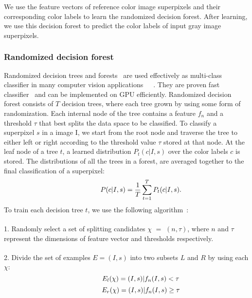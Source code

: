 \documentclass[twocolumn]{svjour3}          %
\begin{document}
We use the feature vectors of reference color image superpixels and their corresponding color labels to learn the randomized decision forest. After learning, we use this decision forest to predict the color labels of input gray image superpixels. 

\subsubsection{Randomized decision forest}
Randomized decision trees and forests~\cite{Leo01} are used effectively as multi-class classifier in many computer vision applications~\cite{Anna07}~\cite{Gang11}~\cite{Shotton11}. They are proven fast classifier~\cite{Toby08} and can be implemented on GPU efficiently. Randomized decision forest consists of $T$ decision trees, where each tree grown by using some form of randomization. Each internal node of the tree contains a feature $f_{n}$ and a threshold $\tau$ that best splits the data space to be classified. To classify a superpixel $s$ in a image I, we start from the root node and traverse the tree to either left or right according to the threshold value $\tau$ stored at that node. At the leaf node of a tree $t$, a learned distribution $P_{t}(c|I, s)$ over the color labels $c$ is stored. The distributions of all the trees in a forest, are averaged together to the final classification of a superpixel:
\begin{equation}
\hspace{15mm} P(c|I, s) = \frac{1}{T}\sum_{t=1}^{T}{P_{t}(c|I, s)}.
\end{equation}
To train each decision tree $t$, we use the following algorithm~\cite{Shotton11}:\\\\
1. Randomly select a set of splitting candidates $\chi$ $=$ $(n, \tau)$, where $n$ and $\tau$ represent the dimensions of feature vector and thresholds respectively.\\\vspace{-2.5mm}\\
2. Divide the set of examples $E = {(I, s)}$ into two subsets $L$ and $R$ by using each $\chi$:
\begin{equation}
\hspace{15mm} E_{l}(\chi) = {(I, s)|f_{n}(I, s) < \tau}
\end{equation}
\begin{equation}
\hspace{15mm} E_{r}(\chi) = {(I, s)|f_{n}(I, s) \geq \tau}
\end{equation}
\end{document}
